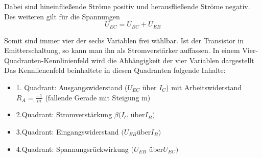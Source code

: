 \documentclass{article}
\begin{document}
Dabei sind hineinfließende Ströme positiv und herausfließende Ströme negativ.\\
Des weiteren gilt für die Spannungen
\begin{equation}
U_{EC}=U_{BC}+U_{EB}
\end{equation}

Somit sind immer vier der sechs Variablen frei wählbar.
Ist der Transistor in Emitterschaltung, so kann man ihn als Stromverstärker auffassen. In einem Vier-Quadranten-Kennlinienfeld wird die Abhängigkeit der vier Variablen dargestellt\\

Das Kennlienenfeld beinhaltete in diesen Quadranten folgende Inhalte:\\
\begin{itemize}
\item 1. Quadrant: Ausgangswiderstand ($U_{EC}$ über $I_C$) mit Arbeitswiderstand $R_A = \frac{-1}{m}$ (fallende Gerade mit Steigung m)
\item 2.Quadrant: Stromverstärkung $\beta  (I_C$ über$ I_B)$
\item 3.Quadrant: Eingangswiderstand $(U_{EB} $über$ I_B)$
\item 4.Quadrant: Spannungsrückwirkung $(U_{EB}$ über$ U_{EC})$ 
\end{itemize}

\begin{center}
\begin{minipage}{\linewidth}
\centering
{}
%
\label{kennlinienfeld}
\end{minipage}
\end{center}
\end{document}
